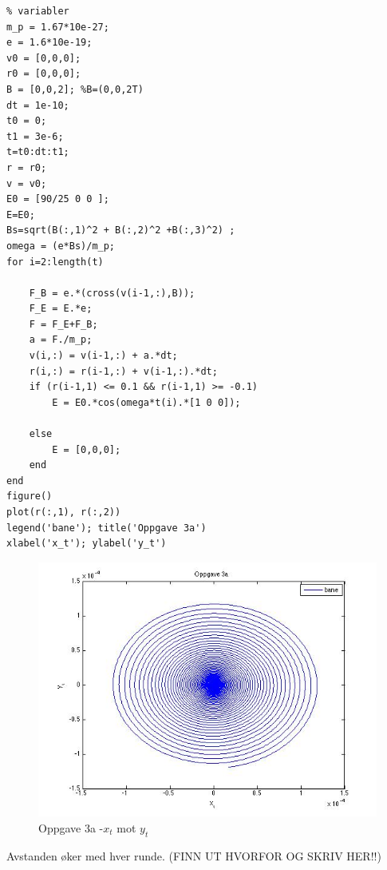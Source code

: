 \documentclass[12pt,a4paper,final,leqno]{report}
\begin{document}
\begin{verbatim}
% variabler
m_p = 1.67*10e-27;
e = 1.6*10e-19;
v0 = [0,0,0];
r0 = [0,0,0];
B = [0,0,2]; %B=(0,0,2T)
dt = 1e-10;
t0 = 0;
t1 = 3e-6;
t=t0:dt:t1;
r = r0;
v = v0;
E0 = [90/25 0 0 ];
E=E0;
Bs=sqrt(B(:,1)^2 + B(:,2)^2 +B(:,3)^2) ; 
omega = (e*Bs)/m_p;
for i=2:length(t)
    
    F_B = e.*(cross(v(i-1,:),B));
    F_E = E.*e;
    F = F_E+F_B;
    a = F./m_p;
    v(i,:) = v(i-1,:) + a.*dt;
    r(i,:) = r(i-1,:) + v(i-1,:).*dt;
    if (r(i-1,1) <= 0.1 && r(i-1,1) >= -0.1)
        E = E0.*cos(omega*t(i).*[1 0 0]);
        
    else
        E = [0,0,0];
    end
end
figure()
plot(r(:,1), r(:,2))
legend('bane'); title('Oppgave 3a')
xlabel('x_t'); ylabel('y_t')

\end{verbatim}
\begin{figure}[H]
\caption{Oppgave 3a -$x_t$ mot $y_t$}
\centering
\includegraphics[width=\textwidth]{oppgave3a.jpg}
\end{figure}

Avstanden øker med hver runde. (FINN UT HVORFOR OG SKRIV HER!!)
\end{document}
